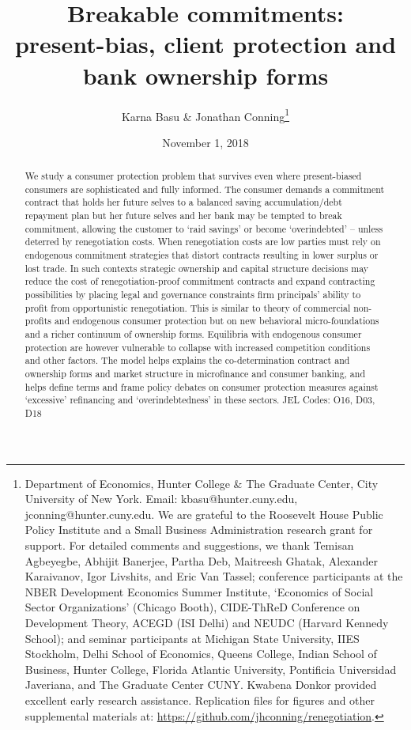 \documentclass[11pt,english]{article}
\date{November 1, 2018}\usepackage{babel}
\theoremstyle{plain}
\theoremstyle{definition}
\begin{document}
\title{Breakable commitments: \\
 present-bias, client protection and bank ownership forms}

\author{Karna Basu \& Jonathan Conning\thanks{Department of Economics, Hunter College \& The Graduate Center, City
University of New York. Email: kbasu@hunter.cuny.edu, jconning@hunter.cuny.edu.
We are grateful to the Roosevelt House Public Policy Institute and
a Small Business Administration research grant for support. For detailed
comments and suggestions, we thank Temisan Agbeyegbe, Abhijit Banerjee,
Partha Deb, Maitreesh Ghatak, Alexander Karaivanov, Igor Livshits,
and Eric Van Tassel; conference participants at the NBER Development
Economics Summer Institute, `Economics of Social Sector Organizations'
(Chicago Booth), CIDE-ThReD Conference on Development Theory, ACEGD
(ISI Delhi) and NEUDC (Harvard Kennedy School); and seminar participants
at Michigan State University, IIES Stockholm, Delhi School of Economics,
Queens College, Indian School of Business, Hunter College, Florida
Atlantic University, Pontificia Universidad Javeriana, and The Graduate
Center CUNY. Kwabena Donkor provided excellent early research assistance.
Replication files for figures and other supplemental materials at:
\protect\protect\protect\url{https://github.com/jhconning/renegotiation}.}}
\maketitle 
\begin{abstract}
We study a consumer protection problem
that survives even where present-biased consumers are sophisticated
and fully informed. The consumer demands a commitment contract that holds her future selves to a balanced saving accumulation/debt repayment plan but her future selves and her bank may be tempted
to break   commitment, allowing the customer to `raid savings' or become `overindebted' -- unless deterred by renegotiation costs. When renegotiation costs are low parties must rely on endogenous commitment  strategies that distort contracts resulting in lower surplus or lost trade. In such contexts
strategic ownership and capital structure decisions may reduce the cost of renegotiation-proof commitment contracts and expand contracting possibilities by placing legal and governance constraints firm principals' ability to profit from
opportunistic renegotiation. This is similar to \citet{hansmann1996}
theory of commercial non-profits and endogenous consumer protection but on new behavioral micro-foundations and a richer continuum of ownership forms.
Equilibria with endogenous consumer protection are however vulnerable to collapse
with  increased competition conditions and other factors. The model helps explains the co-determination contract and ownership forms and market structure in microfinance and consumer
banking, and helps define terms and frame
policy debates on consumer protection measures against `excessive' refinancing
and `overindebtedness' in these sectors. JEL Codes: O16, D03, D18 
\end{abstract}
\newpage{}
\end{document}

